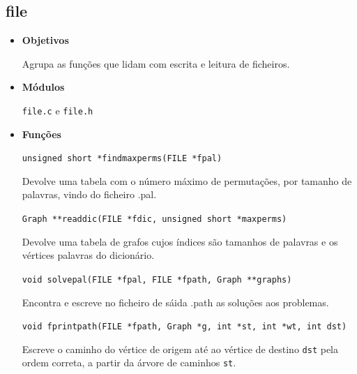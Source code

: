 \documentclass[portuguese, a4paper]{article}
\newcommand\tu[0]{\textunderscore}
\begin{document}
	\subsection{file}
	\begin{itemize}
		\item \textbf{Objetivos}
		\par
		Agrupa as funções que lidam com escrita e leitura de ficheiros.

		\item \textbf{Módulos}
		\par
		\texttt{file.c} e \texttt{file.h}

		\item \textbf{Funções}
		\par
		\texttt{unsigned short *find\tu max\tu perms(FILE *fpal)}
		\par
		Devolve uma tabela com o número máximo de permutações, por tamanho de
		palavras, vindo do ficheiro .pal.

		\par\null\par
		\texttt{Graph **read\tu dic(FILE *fdic, unsigned short *max\tu perms)}
		\par
		Devolve uma tabela de grafos cujos índices são tamanhos de palavras e
		os vértices palavras do dicionário.

		\par\null\par
		\texttt{void solve\tu pal(FILE *fpal, FILE *fpath, Graph **graphs)}
		\par
		Encontra e escreve no ficheiro de sáida .path as soluções aos
		problemas.

		\par\null\par
		\texttt{void fprint\tu path(FILE *fpath, Graph *g, int *st, int *wt,
		int dst)}
		\par
		Escreve o caminho do vértice de origem até ao vértice de destino
		\texttt{dst} pela ordem correta, a partir da árvore de caminhos
		\texttt{st}.
	\end{itemize}
\end{document}
